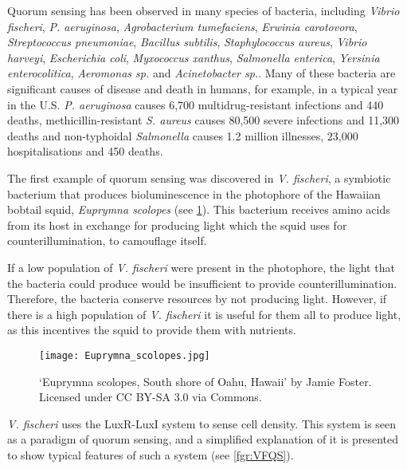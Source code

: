 Quorum sensing has been observed in many species of bacteria, including \textit{Vibrio fischeri}, \textit{P. aeruginosa}, \textit{Agrobacterium tumefaciens}, \textit{Erwinia carotovora}, \textit{Streptococcus pneumoniae}, \textit{Bacillus subtilis}, \textit{Staphylococcus aureus}, \textit{Vibrio harveyi}, \textit{Escherichia coli}, \textit{Myxococcus xanthus}, \textit{Salmonella enterica}, \textit{Yersinia enterocolitica}, \textit{Aeromonas sp.} and \textit{Acinetobacter sp.}\cite{Miller2001,Fuqua1994,Waters2005,Atkinson2006,Chan2011,Sauer2002,Michael2001,Ahmer2004,Nealson1970,Visick2006}. 
Many of these bacteria are significant causes of disease and death in humans, for example, in a typical year in the U.S. \textit{P. aeruginosa} causes 6,700 multidrug-resistant infections and 440 deaths, methicillin-resistant \textit{S. aureus} causes 80,500 severe infections and 11,300 deaths and non-typhoidal \textit{Salmonella} causes 1.2 million illnesses, 23,000 hospitalisations and 450 deaths\cite{ResistanceUS}.




The first example of quorum sensing was discovered in \textit{V. fischeri}, a symbiotic bacterium that produces bioluminescence in the photophore of the Hawaiian bobtail squid, \textit{Euprymna scolopes} \cite{Nealson1970,Miller2001,Visick2006} (see \ref{fgr:ES}). This bacterium receives amino acids\cite{Graf1998, Lemus2000} from its host in exchange for producing light which the squid uses for counterillumination, to camouflage itself\cite{Jones2004}. 

If a low population of \textit{V. fischeri} were present in the photophore, the  light that the bacteria could produce would be insufficient to provide counterillumination. Therefore, the bacteria conserve resources by not producing light.
However, if there is a high population of \textit{V. fischeri} it is useful for them all to produce light, as this incentives the squid to provide them with nutrients. 


\begin{figure}[H]
	\begin{center}
		\texttt{[image: Euprymna\_scolopes.jpg]} 	
		\caption{`Euprymna scolopes, South shore of Oahu, Hawaii' by Jamie Foster. Licensed under CC BY-SA 3.0 via Commons.
		\label{fgr:ES}}
	\end{center}
\end{figure}


\textit{V. fischeri} uses the LuxR-LuxI system to sense cell density. This system is seen as a paradigm of quorum sensing, and a simplified explanation of it is presented to show typical features of such a system (see \ref{fgr:VFQS}).

